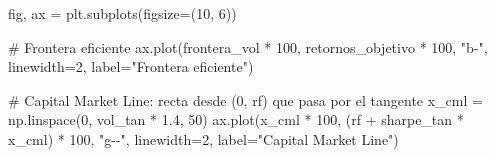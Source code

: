 \documentclass[
  spanish,
  letterpaper,
  DIV=11,
  numbers=noendperiod]{scrreprt}
\newenvironment{Shaded}{\begin{snugshade}}{\end{snugshade}}
\newcommand{\CommentTok}[1]{\textcolor[rgb]{0.37,0.37,0.37}{#1}}
\newcommand{\DecValTok}[1]{\textcolor[rgb]{0.68,0.00,0.00}{#1}}
\newcommand{\FloatTok}[1]{\textcolor[rgb]{0.68,0.00,0.00}{#1}}
\newcommand{\NormalTok}[1]{\textcolor[rgb]{0.00,0.23,0.31}{#1}}
\newcommand{\OperatorTok}[1]{\textcolor[rgb]{0.37,0.37,0.37}{#1}}
\newcommand{\StringTok}[1]{\textcolor[rgb]{0.13,0.47,0.30}{#1}}
\begin{document}
\begin{Shaded}
\begin{Highlighting}[]
\NormalTok{fig, ax }\OperatorTok{=}\NormalTok{ plt.subplots(figsize}\OperatorTok{=}\NormalTok{(}\DecValTok{10}\NormalTok{, }\DecValTok{6}\NormalTok{))}

\CommentTok{\# Frontera eficiente}
\NormalTok{ax.plot(frontera\_vol }\OperatorTok{*} \DecValTok{100}\NormalTok{, retornos\_objetivo }\OperatorTok{*} \DecValTok{100}\NormalTok{, }\StringTok{"b{-}"}\NormalTok{, linewidth}\OperatorTok{=}\DecValTok{2}\NormalTok{,}
\NormalTok{        label}\OperatorTok{=}\StringTok{"Frontera eficiente"}\NormalTok{)}

\CommentTok{\# Capital Market Line: recta desde (0, rf) que pasa por el tangente}
\NormalTok{x\_cml }\OperatorTok{=}\NormalTok{ np.linspace(}\DecValTok{0}\NormalTok{, vol\_tan }\OperatorTok{*} \FloatTok{1.4}\NormalTok{, }\DecValTok{50}\NormalTok{)}
\NormalTok{ax.plot(x\_cml }\OperatorTok{*} \DecValTok{100}\NormalTok{, (rf }\OperatorTok{+}\NormalTok{ sharpe\_tan }\OperatorTok{*}\NormalTok{ x\_cml) }\OperatorTok{*} \DecValTok{100}\NormalTok{, }\StringTok{"g{-}{-}"}\NormalTok{, linewidth}\OperatorTok{=}\DecValTok{2}\NormalTok{,}
\NormalTok{        label}\OperatorTok{=}\StringTok{"Capital Market Line"}\NormalTok{)}


\end{Highlighting}
\end{Shaded}
\end{document}
